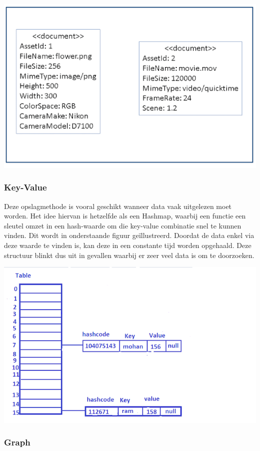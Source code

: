 	\includegraphics[width=\linewidth]{img/documentStoreExample.png}
	
\subsubsection{Key-Value}
\label{sec:Key-Value}

Deze opslagmethode is vooral geschikt wanneer data vaak uitgelezen moet worden. Het idee hiervan is hetzelfde als een Hashmap, waarbij een functie een sleutel omzet in een hash-waarde om die key-value combinatie snel te kunnen vinden. Dit wordt in onderstaande figuur geïllustreerd. Doordat de data enkel via deze waarde te vinden is, kan deze in een constante tijd worden opgehaald. Deze structuur blinkt dus uit in gevallen waarbij er zeer veel data is om te doorzoeken.

	\includegraphics[width=\linewidth]{img/hashMapExample.png}

\subsubsection{Graph}
\label{sec:Graph}

